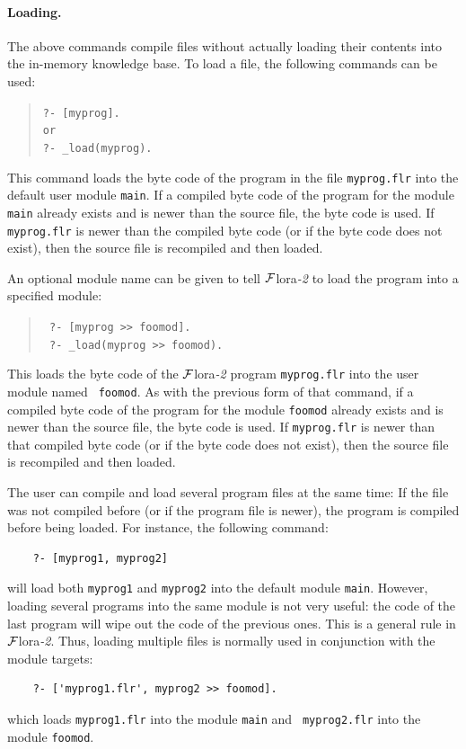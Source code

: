 \documentclass[11pt]{article}
\newcommand{\FLORA}{{\mbox{\sc ${\cal F}${lora}\rm\emph{-2}}}\xspace}
\begin{document}
\paragraph{Loading.}
%
The above commands compile files without actually loading their contents
into the in-memory knowledge base. 
To load a file, the following commands can be used:
\index{\tt [file]}
\begin{quote}
 \tt ?- [myprog].  
 \\
 or
 \\
 \tt ?- \_load(myprog).
\end{quote}
This command loads the byte code of the program in the file {\tt myprog.flr} into the default user
module {\tt main}. If a compiled byte code of the program for the module
{\tt main} already exists and is newer than the source file, the byte code
is used.  If {\tt myprog.flr} is newer than the compiled byte code (or if
the byte code does not exist), then
the source file is recompiled and then loaded.

An optional module name can be given to tell \FLORA to
load the program into a specified module:
\begin{quote}
  \tt
    ?- [myprog >> foomod].\\
    \tt
    ?- \_load(myprog >> foomod).
\end{quote}
This loads the byte code of the \FLORA program {\tt myprog.flr} into the user module named {\tt
  foomod}. As with the previous form of that command, if a compiled byte code of the program for the module
{\tt foomod} already exists and is newer than the source file, the byte code
is used.  If {\tt myprog.flr} is newer than that compiled byte code (or if
the byte code does not exist), then
the source file is recompiled and then loaded.

The user can compile and load several program
files at the same time: If the file was not compiled before (or if the
program file is newer), the program is compiled before being loaded.
For instance, the following command:
\begin{verbatim}
    ?- [myprog1, myprog2]
\end{verbatim}
will load both {\tt myprog1} and {\tt myprog2} into the default module
{\tt main}. However, loading several programs into the same module is not
very useful: the code of the last program will wipe out the code of the
previous ones. This is a general rule in \FLORA. Thus, loading
multiple files is normally used in conjunction with the module targets:
\begin{verbatim}
    ?- ['myprog1.flr', myprog2 >> foomod].
\end{verbatim}
which loads {\tt myprog1.flr} into the module {\tt main} and {\tt
  myprog2.flr} into the module {\tt foomod}.
\end{document}
